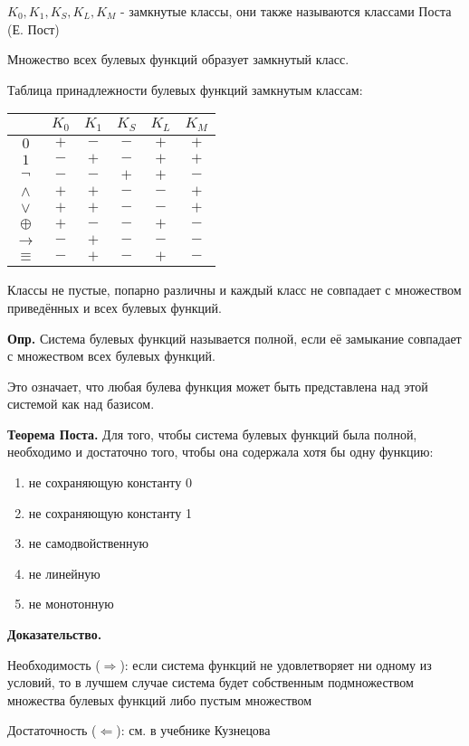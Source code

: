 \documentclass[10pt]{article}
\begin{document}
\par $K_0, K_1, K_S, K_L, K_M$ - замкнутые классы, они также называются классами Поста (Е. Пост)
\par Множество всех булевых функций образует замкнутый класс.
\par Таблица принадлежности булевых функций замкнутым классам:
\par \begin{tabular}{|c|c|c|c|c|c|}
    \hline
    & $K_0$ & $K_1$ & $K_S$ & $K_L$ & $K_M$ \\
    \hline
    $0$ & $+$ & $-$ & $-$ & $+$ & $+$ \\
    \hline
    $1$ & $-$ & $+$ & $-$ & $+$ & $+$ \\
    \hline
    $\neg$ & $-$ & $-$ & $+$ & $+$ & $-$ \\
    \hline
    $\land$ & $+$ & $+$ & $-$ & $-$ & $+$ \\
    \hline
    $\lor$ & $+$ & $+$ & $-$ & $-$ & $+$ \\
    \hline
    $\oplus$ & $+$ & $-$ & $-$ & $+$ & $-$ \\
    \hline
    $\rightarrow$ & $-$ & $+$ & $-$ & $-$ & $-$ \\
    \hline
    $\equiv$ & $-$ & $+$ &$-$ & $+$ & $-$ \\
    \hline
\end{tabular}
\par Классы не пустые, попарно различны и каждый класс не совпадает с множеством приведённых и всех булевых функций.
\par\textbf{Опр.} Система булевых функций называется полной, если её замыкание совпадает с множеством всех булевых функций.
\par Это означает, что любая булева функция может быть представлена над этой системой как над базисом.
\par\textbf{Теорема Поста.} Для того, чтобы система булевых функций была полной, необходимо и достаточно того, чтобы она содержала хотя бы одну функцию:
\begin{enumerate}
    \item не сохраняющую константу 0
    \item не сохраняющую константу 1
    \item не самодвойственную
    \item не линейную
    \item не монотонную
\end{enumerate}
\par\textbf{Доказательство.}
\par Необходимость ($\Rightarrow$): если система функций не удовлетворяет ни одному из условий, то в лучшем случае система будет собственным подмножеством множества булевых функций либо пустым множеством
\par Достаточность ($\Leftarrow$): см. в учебнике Кузнецова
\end{document}
